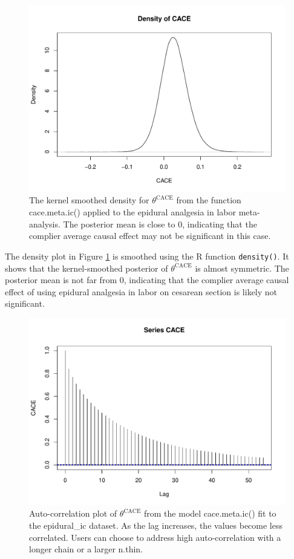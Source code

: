 \begin{figure}

{\centering \includegraphics[width=0.9\linewidth,height=0.4\textheight]{posdens} 

}

\caption{The kernel smoothed density for $\theta^{\text{CACE}}$ from the function cace.meta.ic() applied to the epidural analgesia in labor meta-analysis. The posterior mean is close to 0, indicating that the complier average causal effect may not be significant in this case.}\label{fig:density}
\end{figure}

The density plot in Figure \ref{fig:density} is smoothed using the R function \texttt{density()}. It shows that the kernel-smoothed posterior of \(\theta^\text{CACE}\) is almost symmetric. The posterior mean is not far from 0, indicating that the complier average causal effect of using epidural analgesia in labor on cesarean section is likely not significant.

\begin{figure}

{\centering \includegraphics[width=0.9\linewidth,height=0.4\textheight]{autocor} 

}

\caption{Auto-correlation plot of $\theta^{\text{CACE}}$ from the model cace.meta.ic() fit to the epidural\_ic dataset. As the lag increases, the values become less correlated. Users can choose to address high auto-correlation with a longer chain or a larger n.thin.}\label{fig:autocorr}
\end{figure}

